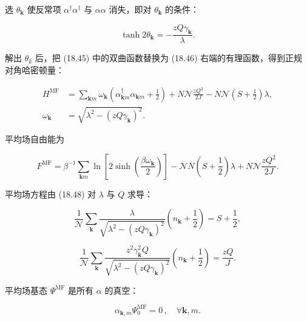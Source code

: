 选 $\theta_{\mathbf{k}}$ 使反常项 $\alpha^{\dagger}\alpha^{\dagger}$ 与 $\alpha \alpha$ 消失，即对 $\theta_{\mathbf{k}}$ 的条件：

\begin{equation*}
\tanh 2 \theta_ {\mathbf {k}} = - \frac {z Q \gamma_ {\mathbf {k}}}{\lambda}.
\tag{18.46}
\end{equation*}

解出 $\theta_{k}$ 后，把 (18.45) 中的双曲函数替换为 (18.46) 右端的有理函数，得到正规对角哈密顿量：

\begin{align*}
H ^ {\mathrm{MF}} & = \sum_{\mathbf {k} m} \omega_ {\mathbf {k}} \left( \alpha_{\mathbf {k} m} ^ {\dagger} \alpha_{\mathbf {k} m} + \frac {1}{2} \right) + N \mathcal {N} \frac {z Q ^ {2}}{2 J} - N \mathcal {N} \left( S + \frac {1}{2} \right) \lambda ,\\
\omega_ {\mathbf {k}} & = \sqrt {\lambda^ {2} - \left( z Q \gamma_ {\mathbf {k}} \right) ^ {2}} .
\tag{18.47}
\end{align*}

平均场自由能为

\begin{equation*}
F ^ {\mathrm{MF}} = \beta^ {- 1} \sum_{\mathbf {k} m} \ln \left[ 2 \sinh \left( \frac {\beta \omega_ {\mathbf {k}}}{2} \right) \right] - \mathcal {N} N \left( S + \frac {1}{2} \right) \lambda + N \mathcal {N} \frac {z Q ^ {2}}{2 J}.
\tag{18.48}
\end{equation*}

平均场方程由 (18.48) 对 $\lambda$ 与 $Q$ 求导：

\begin{equation*}
\frac {1}{\mathcal {N}} \sum_ {\mathbf {k}} \frac {\lambda}{\sqrt {\lambda^ {2} - \left( z Q \gamma_ {\mathbf {k}} \right) ^ {2}}} \left( n _ {\mathbf {k}} + \frac {1}{2} \right) = S + \frac {1}{2} ,
\tag{18.49}
\end{equation*}

\begin{equation*}
\frac {1}{\mathcal {N}} \sum_{\mathbf {k}} \frac {z ^ {2} \gamma_{\mathbf {k}} ^ {2} Q}{\sqrt {\lambda^ {2} - \left( z Q \gamma_{\mathbf {k}} \right) ^ {2}}} \left( n _ {\mathbf {k}} + \frac {1}{2} \right) = \frac {z Q}{J}.
\tag{18.50}
\end{equation*}

平均场基态 $\Psi^{\mathrm{MF}}$ 是所有 $\alpha$ 的真空：

\begin{equation*}
\alpha_{\mathbf {k}, m} \Psi_ {0} ^ {\mathrm{MF}} = 0 \, , \quad \forall \mathbf {k}, m.
\tag{18.51}
\end{equation*}

